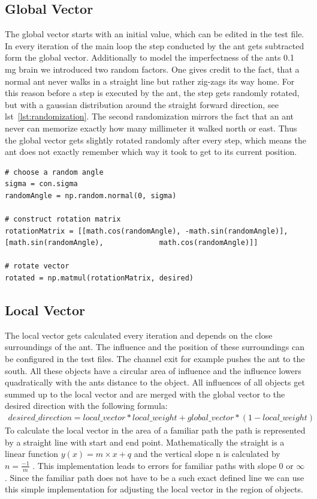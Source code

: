 \documentclass[11pt]{article}
\begin{document}
	\subsection{Global Vector}
		The global vector starts with an initial value, which can be edited in the test file. In every iteration of the main loop the step conducted by the ant gets subtracted form the global vector. Additionally to model the imperfectness of the ants 0.1 mg brain we introduced two random factors. One gives credit to the fact, that a normal ant never walks in a straight line but rather zig-zags its way home. For this reason before a step is executed by the ant, the step gets randomly rotated, but with a gaussian distribution around the straight forward direction, see lst~\vref{lst:randomization}. The second randomization mirrors the fact that an ant never can memorize exactly how many millimeter it walked north or east. Thus the global vector gets slightly rotated randomly after every step, which means the ant does not exactly remember which way it took to get to its current position.
		
		
		
\begin{lstlisting}[caption={Randomization of desired step},label=lst:randomization]
# choose a random angle
sigma = con.sigma
randomAngle = np.random.normal(0, sigma)

# construct rotation matrix
rotationMatrix = [[math.cos(randomAngle), -math.sin(randomAngle)], [math.sin(randomAngle), 			   math.cos(randomAngle)]]

# rotate vector
rotated = np.matmul(rotationMatrix, desired)
\end{lstlisting}

	\subsection{Local Vector}
		The local vector gets calculated every iteration and depends on the close surroundings of the ant. The influence and the position of these surroundings can be configured in the test files. The channel exit for example pushes the ant to the south. All these objects have a circular area of influence and the influence lowers quadratically with the ants distance to the object. All influences of all objects get summed up to the local vector and are merged with the global vector to the desired direction with the following formula:
		\begin{align*}
			desired\_direction = local\_vector * local\_weight + global\_vector * (1-local\_weight)
		\end{align*}
To calculate the local vector in the area of a familiar path the path is represented by a straight line with start and end point. Mathematically the straight is a linear function \( y(x)= m\times x + q \) and the vertical slope n is calculated by \( n = \frac {-1} {m}\) . This implementation leads to errors for familiar paths with slope 0 or \(\infty\). Since the familiar path does not have to be a such exact defined line we can use this simple implementation for adjusting the local vector in the region of objects. 
\end{document}
